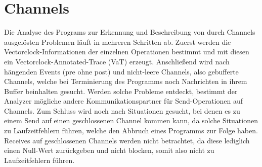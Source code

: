 \section{Channels}\label{Chap:Analyse-Sec:Channel}
Die Analyse des Programs zur Erkennung und Beschreibung von durch Channels ausgelösten 
Problemen läuft in mehreren Schritten ab. Zuerst werden die Vectorclock-Informationen 
der einzelnen Operationen bestimmt und mit diesen ein Vectorclock-Annotated-Trace 
(VaT) erzeugt. Anschließend wird nach hängenden Events (pre ohne post) und 
nicht-leere Channels, also gebufferte Channels, welche bei Terminierung 
des Programms noch Nachrichten in ihrem Buffer beinhalten gesucht. 
Werden solche Probleme entdeckt, bestimmt der Analyzer mögliche andere 
Kommunikationspartner für Send-Operationen auf Channels. Zum Schluss 
wird noch nach Situationen gesucht, bei denen es zu einem Send auf einen 
geschlossenen Channel kommen kann, da solche Situationen zu Laufzeitfehlern 
führen, welche den Abbruch eines Programms zur Folge haben.
Receives auf geschlossenen Channels werden nicht betrachtet, da diese 
lediglich einen Null-Wert zurückgeben und nicht blocken, somit also nicht 
zu Laufzeitfehlern führen. 

